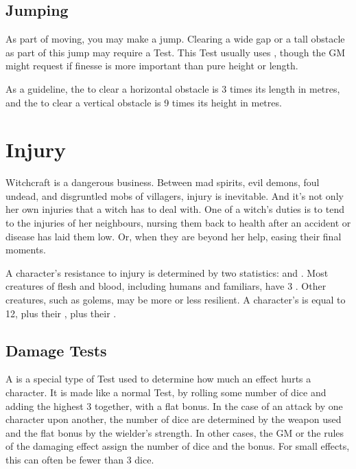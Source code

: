 \subsection{Jumping}

As part of moving, you may make a jump.
Clearing a wide gap or a tall obstacle as part of this jump may require a Test.
This Test usually uses , though the GM might request  if finesse is more important than pure height or length.

As a guideline, the {\tn} to clear a horizontal obstacle is 3 times its length in metres, and the {\tn} to clear a vertical obstacle is 9 times its height in metres.

\section{Injury}

Witchcraft is a dangerous business.
Between mad spirits, evil demons, foul undead, and disgruntled mobs of villagers, injury is inevitable.
And it's not only her own injuries that a witch has to deal with.
One of a witch's duties is to tend to the injuries of her neighbours, nursing them back to health after an accident or disease has laid them low.
Or, when they are beyond her help, easing their final moments.

A character's resistance to injury is determined by two statistics:  and .
Most creatures of flesh and blood, including humans and familiars, have 3 .
Other creatures, such as golems, may be more or less resilient.
A character's  is equal to 12, plus their , plus their .

\subsection{Damage Tests}

A {\damagetest} is a special type of Test used to determine how much an effect hurts a character.
It is made like a normal Test, by rolling some number of dice and adding the highest 3 together, with a flat bonus.
In the case of an attack by one character upon another, the number of dice are determined by the weapon used and the flat bonus by the wielder's strength.
In other cases, the GM or the rules of the damaging effect assign the number of dice and the bonus.
For small effects, this can often be fewer than 3 dice.

